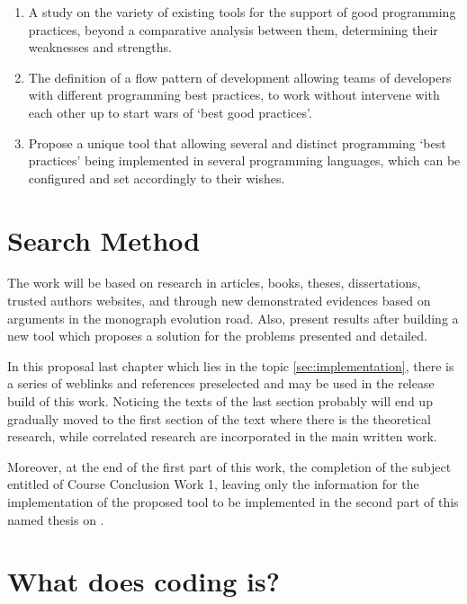 \begin{englishtext}
\begin{enumerate}
        \item A study on the variety of existing tools for the support of good
        programming practices, beyond a comparative analysis between them,
        determining their weaknesses and strengths.

        \item The definition of a flow pattern of development allowing teams of
        developers with different programming best practices, to work without
        intervene with each other up to start wars of `best good practices'.

        \item Propose a unique tool that allowing several and distinct
        programming `best practices' being implemented in several programming
        languages, which can be configured and set accordingly to their wishes.
    \end{enumerate}



    \section{Search Method}

    The work will be based on research in articles, books, theses,
    dissertations, trusted authors websites, and through new demonstrated
    evidences based on arguments in the monograph evolution road. Also, present
    results after building a new tool which proposes a solution for the problems
    presented and detailed. \cite{aspectOriented}

    In this proposal last chapter which lies in the topic
    \autoref{sec:implementation}, there is a series of weblinks and references
    preselected and may be used in the release build of this work. Noticing the
    texts of the last section probably will end up gradually moved to the first
    section of the text where there is the theoretical research, while
    correlated research are incorporated in the main written work.
    \cite{aspectOrientationReview}

    Moreover, at the end of the first part of this work, the completion of the
    subject entitled of Course Conclusion Work 1, leaving only the information
    for the implementation of the proposed tool to be implemented in the second
    part of this named thesis on .



    \section{What does coding is?}


\end{englishtext}
